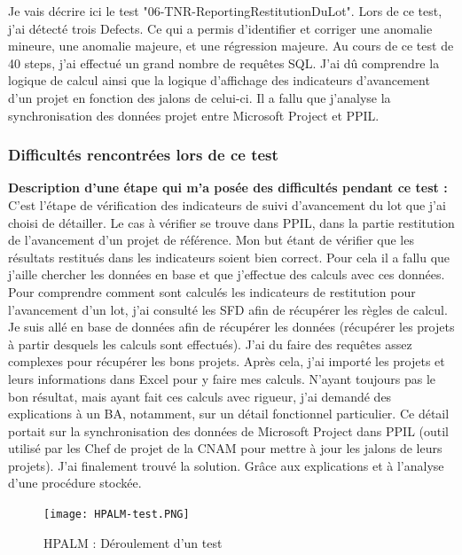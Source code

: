 Je vais décrire ici le test "06-TNR-ReportingRestitutionDuLot". Lors de ce test, j'ai détecté trois Defects. Ce qui a permis d'identifier et corriger une anomalie mineure, une anomalie majeure, et une régression majeure. Au cours de ce test de 40 steps, j'ai effectué un grand nombre de requêtes SQL. J'ai dû comprendre la logique de calcul ainsi que la logique d'affichage des indicateurs d'avancement d'un projet en fonction des jalons de celui-ci. Il a fallu que j'analyse la synchronisation des données projet entre Microsoft Project et PPIL.

\subsubsection{Difficultés rencontrées lors de ce test}

\textbf{Description d'une étape qui m'a posée des difficultés pendant ce test :}
C'est l'étape de vérification des indicateurs de suivi d'avancement du lot que j'ai choisi de détailler.
Le cas à vérifier se trouve dans PPIL, dans la partie restitution de l'avancement d'un projet de référence. Mon but étant de vérifier que les résultats restitués dans les indicateurs soient bien correct. Pour cela il a fallu que j'aille chercher les données en base et que j'effectue des calculs avec ces données.
Pour comprendre comment sont calculés les indicateurs de restitution pour l'avancement d'un lot, j'ai consulté les SFD afin de récupérer les règles de calcul. Je suis allé en base de données afin de récupérer les données (récupérer les projets à partir desquels les calculs sont effectués). J'ai du faire des requêtes assez complexes pour récupérer les bons projets. Après cela, j'ai importé les projets et leurs informations dans Excel pour y faire mes calculs. N'ayant toujours pas le bon résultat, mais ayant fait ces calculs avec rigueur, j'ai demandé des explications à un BA, notamment, sur un détail fonctionnel particulier. Ce détail portait sur la synchronisation des données de Microsoft Project dans PPIL (outil utilisé par les Chef de projet de la CNAM pour mettre à jour les jalons de leurs projets). J'ai finalement trouvé la solution. Grâce aux explications et à l'analyse d'une procédure stockée.

\begin{figure}[h]
\centering
\texttt{[image: HPALM-test.PNG]}\\[1cm]
\caption{HPALM : Déroulement d'un test}
\end{figure}

